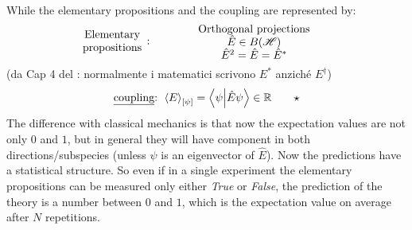 \documentclass[../main.tex]{subfiles}
\begin{document}
While the elementary propositions and the coupling are represented by:
\[
\parbox{2 cm}{\centering Elementary\\ propositions}: \qquad \parbox{5 cm}{\centering \textrm{Orthogonal projections } $\hat{E}\in B(\mathcal{H})$
    \\ $\hat{E}^2=\hat{E}=\hat{E}^*$}
\]
(da Cap 4 del : normalmente i matematici scrivono $E^\ast$ anziché $E^\dag$)
\[
    \textrm{\underline{coupling}: } \expval{E}_\qty[\psi]=\braket{\psi}{\hat{E}\psi}\in\mathbb{R} \quad \quad \star
\]
The difference with classical mechanics is that now the expectation values are not only $0$ and $1$, but in general they will have component in both directions/subspecies (unless $\psi$ is an eigenvector of $\hat{E}$). Now the predictions have a statistical structure. So even if in a single experiment the elementary propositions can be measured only either \textit{True} or \textit{False}, the prediction of the theory is a number between $0$ and $1$, which is the expectation value on average after $N$ repetitions.
\end{document}
